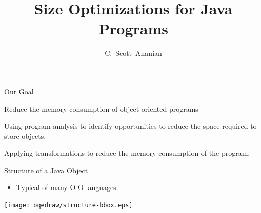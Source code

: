 \documentclass[%
pdf,
colorBG,
slideColor,
nototal,
oqe
]{prosper}
\title{Size Optimizations for Java Programs}
\author{C.~Scott~Ananian}
\begin{document}
\maketitle


\begin{slide}{Our Goal}
\begin{center}
Reduce the memory consumption of object-oriented programs

\vspace{0.5cm}
\vspace{0.5cm}

Using program analysis to identify opportunities to reduce the space
required to store objects,

\vspace{0.5cm}
\vspace{0.5cm}

Applying transformations to reduce the memory consumption of the program.
\end{center}
\end{slide}

\begin{slide}{Structure of a Java Object}
\begin{itemize}
\item Typical of many O-O languages.
\end{itemize}
\begin{center}
\texttt{[image: oqedraw/structure-bbox.eps]}
\end{center}
\end{slide}
\end{document}
